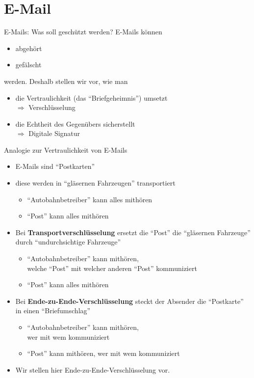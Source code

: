 \section{E-Mail}
  \begin{frame}{E-Mails: Was soll geschützt werden?}
    E-Mails können
    \begin{itemize}
      \item abgehört
      \item gefälscht
    \end{itemize}
    werden. Deshalb stellen wir vor, wie man
    \begin{itemize}
      \item die Vertraulichkeit (das ``Briefgeheimnis'') umsetzt
      \\ $\Rightarrow$ Verschlüsselung
      \item die Echtheit des Gegenübers sicherstellt
      \\ $\Rightarrow$ Digitale Signatur
    \end{itemize}
  \end{frame}

  \begin{frame}{Analogie zur Vertraulichkeit von E-Mails}
    \begin{itemize}
      \item E-Mails sind ``Postkarten''
      \item diese werden in ``gläsernen Fahrzeugen'' transportiert
      \begin{itemize}
        \item ``Autobahnbetreiber'' kann alles mithören
        \item ``Post'' kann alles mithören
      \end{itemize}
      \item Bei \textbf{Transportverschlüsselung} ersetzt die ``Post'' die ``gläsernen Fahrzeuge'' durch ``undurchsichtige Fahrzeuge''
      \begin{itemize}
        \item ``Autobahnbetreiber'' kann mithören,\\welche ``Post'' mit welcher anderen ``Post'' kommuniziert
        \item ``Post'' kann alles mithören
      \end{itemize}
      \item Bei \textbf{Ende-zu-Ende-Verschlüsselung} steckt der Absender die ``Postkarte'' in einen ``Briefumschlag''
      \begin{itemize}
        \item ``Autobahnbetreiber'' kann mithören,\\wer mit wem kommuniziert
        \item ``Post'' kann mithören, wer mit wem kommuniziert
      \end{itemize}
      \item Wir stellen hier Ende-zu-Ende-Verschlüsselung vor.
    \end{itemize}
  \end{frame}

